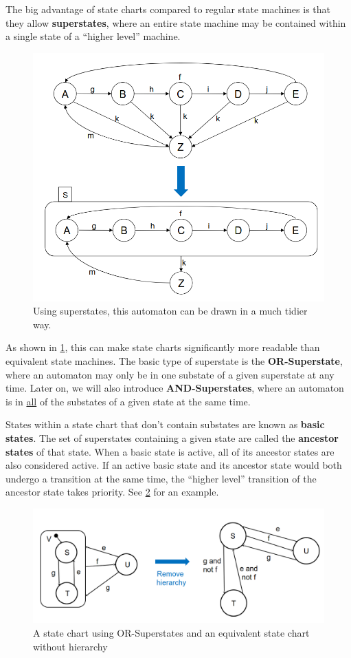 \documentclass{report}
\newcommand{\tbf}{\textbf}
\newcommand*{\newpar}{\par\vspace{\baselineskip}\noindent} %
\begin{document}
\newpar
The big advantage of state charts compared to regular state machines is that they allow \tbf{superstates}, where an entire state machine may be contained within a single state of a ``higher level'' machine.
\begin{figure}[h!]
\centering
\includegraphics[scale=0.3]{figures/superstates}
\caption{Using superstates, this automaton can be drawn in a much tidier way.}
\label{fig:superstates}
\end{figure}
\newpar
As shown in \ref{fig:superstates}, this can make state charts significantly more readable than equivalent state machines. The basic type of superstate is the \tbf{OR-Superstate}, where an automaton may only be in one substate of a given superstate at any time. Later on, we will also introduce \tbf{AND-Superstates}, where an automaton is in \underline{all} of the substates of a given state at the same time.
\newpar
States within a state chart that don't contain substates are known as \tbf{basic states}. The set of superstates containing a given state are called the \tbf{ancestor states} of that state. When a basic state is active, all of its ancestor states are also considered active. If an active basic state and its ancestor state would both undergo a transition at the same time, the ``higher level'' transition of the ancestor state takes priority. See \ref{fig:priorities} for an example.
\begin{figure}[h!]
\centering
\includegraphics[scale=0.3]{figures/statechartpriorities}
\caption{A state chart using OR-Superstates and an equivalent state chart without hierarchy}
\label{fig:priorities}
\end{figure}
\end{document}
